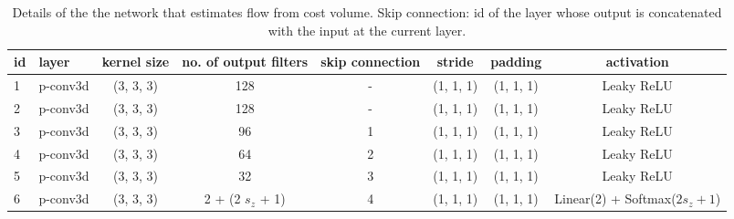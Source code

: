 \documentclass[preprint]{vgtc}
\begin{document}
    \begin{table*}
        \centering
        \begin{tabular}{l|lcccccc}
            \hline
            \textbf{id} & \textbf{layer} & \textbf{kernel size} & \textbf{no. of output filters} & \textbf{skip connection} & \textbf{stride} & \textbf{padding} & \textbf{activation} \\
            \hline
            1 & p-conv3d & (3, 3, 3) & 128 & - & (1, 1, 1) & (1, 1, 1) & Leaky ReLU \\
            2 & p-conv3d & (3, 3, 3) & 128 & - & (1, 1, 1) & (1, 1, 1) & Leaky ReLU \\
            3 & p-conv3d & (3, 3, 3) & 96 & 1 & (1, 1, 1) & (1, 1, 1) & Leaky ReLU \\
            4 & p-conv3d & (3, 3, 3) & 64 & 2 & (1, 1, 1) & (1, 1, 1) & Leaky ReLU \\
            5 & p-conv3d & (3, 3, 3) & 32 & 3 & (1, 1, 1) & (1, 1, 1) & Leaky ReLU \\
            6 & p-conv3d & (3, 3, 3) & 2 + (2 $s_z$ + 1) & 4 & (1, 1, 1) & (1, 1, 1) & Linear(2) + Softmax($2 s_z + 1$) \\
            \hline
        \end{tabular}
        \caption{Details of the the network that estimates flow from cost volume. Skip connection: id of the layer whose output is concatenated with the input at the current layer.}
        \label{tab:pwc-flow-estimation}
    \end{table*}
\end{document}
